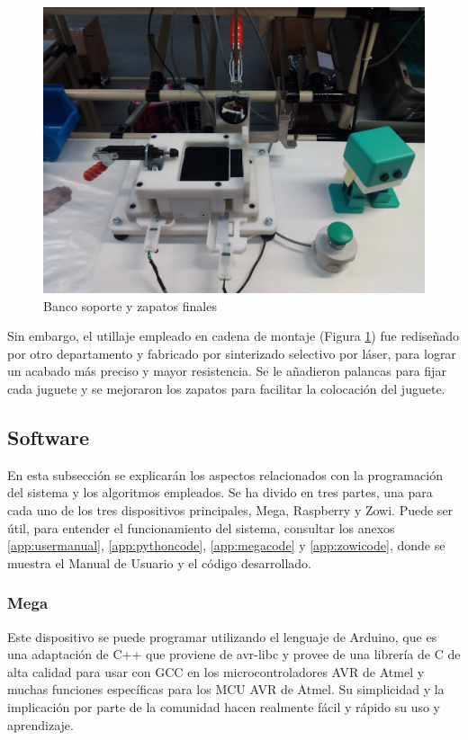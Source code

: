 \begin{figure}
\centering
\includegraphics[width=120mm]{Figures/bancoFabrica}
\caption{Banco soporte y zapatos finales}
\label{fig:bancoFabrica}
\end{figure}

Sin embargo, el utillaje empleado en cadena de montaje (Figura \ref{fig:bancoFabrica}) fue rediseñado por otro departamento y fabricado por sinterizado selectivo por láser, para lograr un acabado más preciso y mayor resistencia. Se le añadieron palancas para fijar cada juguete y se mejoraron los zapatos para facilitar la colocación del juguete.


\subsection{Software}
\label{subsec:Software}
En esta subsección se explicarán los aspectos relacionados con la programación del sistema y los algoritmos empleados. Se ha divido en tres partes, una para cada uno de los tres dispositivos principales, Mega, Raspberry y Zowi. Puede ser útil, para entender el funcionamiento del sistema, consultar los anexos \ref{app:usermanual}, \ref{app:pythoncode}, \ref{app:megacode} y \ref{app:zowicode}, donde se muestra el Manual de Usuario y el código desarrollado.

\subsubsection{Mega}
Este dispositivo se puede programar utilizando el lenguaje de Arduino,  que es una adaptación de C++ que proviene de avr-libc y provee de una librería de C de alta calidad para usar con GCC en los microcontroladores AVR de Atmel y muchas funciones específicas para los MCU AVR de Atmel. Su simplicidad y la implicación por parte de la comunidad hacen realmente fácil y rápido su uso y aprendizaje.

